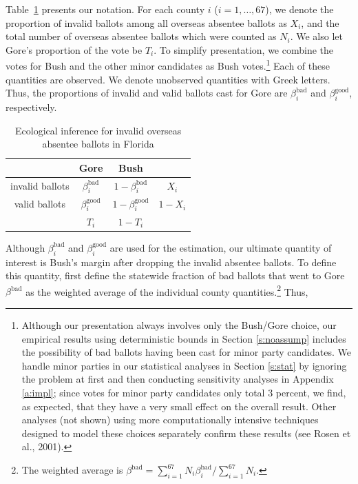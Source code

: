 \documentclass[11pt,titlepage]{article}
\newcommand{\bb}{\beta^{\text{bad}}}
\newcommand{\bg}{\beta^{\text{good}}}
\begin{document}
Table~\ref{tb:ei} presents our notation.  For each county $i$
($i=1,\dots,67$), we denote the proportion of invalid ballots among
all overseas absentee ballots as $X_i$, and the total number of
overseas absentee ballots which were counted as $N_i$.  We also let
Gore's proportion of the vote be $T_i$.  To simplify presentation, we
combine the votes for Bush and the other minor candidates as Bush
votes.\footnote{Although our presentation always involves only the
  Bush/Gore choice, our empirical results using deterministic bounds
  in Section \ref{s:noassump} includes the possibility of bad ballots
  having been cast for minor party candidates.  We handle minor
  parties in our statistical analyses in Section \ref{s:stat} by
  ignoring the problem at first and then conducting sensitivity
  analyses in Appendix \ref{a:impl}; since votes for minor party
  candidates only total 3 percent, we find, as expected, that they
  have a very small effect on the overall result.  Other analyses (not
  shown) using more computationally intensive techniques designed to
  model these choices separately confirm these results (see Rosen et
  al., 2001)\nocite{RosJaiKin01}.}  Each of these quantities are
observed.  We denote unobserved quantities with Greek letters.  Thus,
the proportions of invalid and valid ballots cast for Gore are $\bb_i$
and $\bg_i$, respectively.
\begin{table}[t]
\begin{center}
\begin{tabular}{cccc}
                & Gore  & Bush &         \\
\hline 
invalid ballots & $\bb_i$  & $1-\bb_i$ & $X_i$   \\
valid ballots   & $\bg_i$  & $1-\bg_i$ & $1-X_i$ \\
\hline
                & $T_i$ & $1-T_i$ &         \\
\end{tabular} \caption{Ecological inference for invalid overseas
  absentee ballots in Florida}\label{tb:ei}
\end{center}
\end{table} 

Although $\bb_i$ and $\bg_i$ are used for the estimation, our ultimate
quantity of interest is Bush's margin after dropping the invalid
absentee ballots.  To define this quantity, first define the statewide
fraction of bad ballots that went to Gore $\bb$ as the weighted
average of the individual county quantities.\footnote{The weighted
  average is $\bb=\sum_{i=1}^{67}N_i\bb_i/\sum_{i=1}^{67}N_i$.}  Thus,
\end{document}
